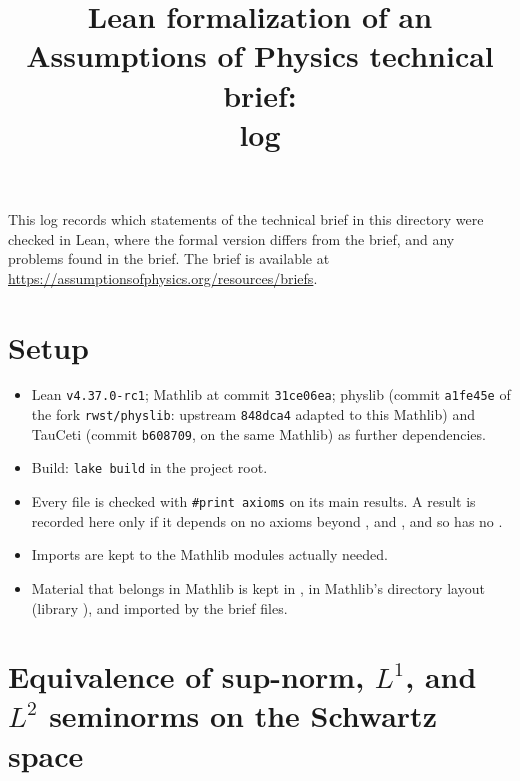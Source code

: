 \documentclass[11pt]{article}
\title{Lean formalization of an Assumptions of Physics technical brief:\\ log}
\author{}
\date{}
\begin{document}
\maketitle

\noindent
This log records which statements of the technical brief in this directory were checked in Lean,
where the formal version differs from the brief, and any problems found in the brief.
The brief is available at \url{https://assumptionsofphysics.org/resources/briefs}.

\section*{Setup}

\begin{itemize}
\item Lean \texttt{v4.37.0-rc1}; Mathlib at commit \texttt{31ce06ea}; physlib (commit \texttt{a1fe45e}
  of the fork \texttt{rwst/physlib}: upstream \texttt{848dca4} adapted to this Mathlib) and
  TauCeti (commit \texttt{b608709}, on the same Mathlib) as further dependencies.
\item Build: \texttt{lake build} in the project root.
\item Every file is checked with \texttt{\#print axioms} on its main results. A result is
  recorded here only if it depends on no axioms beyond ,
   and , and so has no .
\item Imports are kept to the Mathlib modules actually needed.
\item Material that belongs in Mathlib is kept in , in Mathlib's directory
  layout (library ), and imported by the brief files.
\end{itemize}



\section{Equivalence of sup-norm, \texorpdfstring{$L^1$}{L1}, and \texorpdfstring{$L^2$}{L2}
  seminorms on the Schwartz space}
\end{document}
